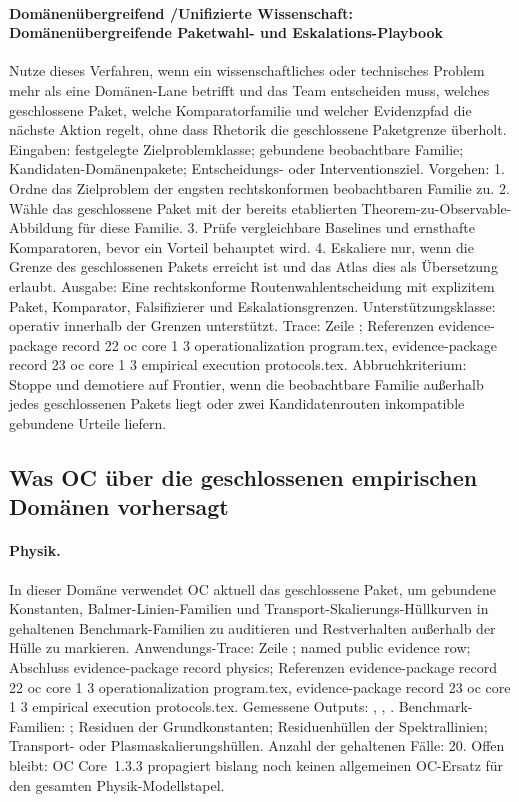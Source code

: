 \paragraph{Domänenübergreifend /\allowbreak Unifizierte Wissenschaft: Domänenübergreifende Paketwahl- und Eskalations-Playbook}
Nutze dieses Verfahren, wenn ein wissenschaftliches oder technisches Problem mehr als eine Domänen-Lane betrifft und das Team entscheiden muss, welches geschlossene Paket, welche Komparatorfamilie und welcher Evidenzpfad die nächste Aktion regelt, ohne dass Rhetorik die geschlossene Paketgrenze überholt.
Eingaben: festgelegte Zielproblemklasse; \allowbreak gebundene beobachtbare Familie; \allowbreak Kandidaten-Domänenpakete; \allowbreak Entscheidungs- oder Interventionsziel.
Vorgehen: 1. Ordne das Zielproblem der engsten rechtskonformen beobachtbaren Familie zu. 2. Wähle das geschlossene Paket mit der bereits etablierten Theorem-zu-Observable-Abbildung für diese Familie. 3. Prüfe vergleichbare Baselines und ernsthafte Komparatoren, bevor ein Vorteil behauptet wird. 4. Eskaliere nur, wenn die Grenze des geschlossenen Pakets erreicht ist und das Atlas dies als Übersetzung erlaubt.
Ausgabe: Eine rechtskonforme Routenwahlentscheidung mit explizitem Paket, Komparator, Falsifizierer und Eskalationsgrenzen.
Unterstützungsklasse: operativ innerhalb der Grenzen unterstützt.
Trace: Zeile ; \allowbreak Referenzen evidence-package record 22 oc core 1 3 operationalization program.tex, \allowbreak evidence-package record 23 oc core 1 3 empirical execution protocols.tex.
Abbruchkriterium: Stoppe und demotiere auf Frontier, wenn die beobachtbare Familie außerhalb jedes geschlossenen Pakets liegt oder zwei Kandidatenrouten inkompatible gebundene Urteile liefern.

\subsection{Was OC über die geschlossenen empirischen Domänen vorhersagt}

\paragraph{Physik.}
In dieser Domäne verwendet OC aktuell das geschlossene Paket, um gebundene Konstanten, Balmer-Linien-Familien und Transport-Skalierungs-Hüllkurven in gehaltenen Benchmark-Familien zu auditieren und Restverhalten außerhalb der Hülle zu markieren.
Anwendungs-Trace: Zeile ; named public evidence row; \allowbreak Abschluss evidence-package record physics; \allowbreak Referenzen evidence-package record 22 oc core 1 3 operationalization program.tex, \allowbreak evidence-package record 23 oc core 1 3 empirical execution protocols.tex.
Gemessene Outputs: , , .
Benchmark-Familien: ; Residuen der Grundkonstanten; Residuenhüllen der Spektrallinien; Transport- oder Plasmaskalierungshüllen.
Anzahl der gehaltenen Fälle: 20.
Offen bleibt: OC Core~1.3.3 propagiert bislang noch keinen allgemeinen OC-Ersatz für den gesamten Physik-Modellstapel.

